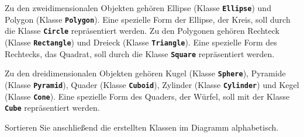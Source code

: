 Zu den zweidimensionalen Objekten gehören Ellipse (Klasse \texttt{\textbf{Ellipse}}) und Polygon (Klasse \texttt{\textbf{Polygon}}). Eine spezielle Form der Ellipse, der Kreis, soll durch die Klasse \texttt{\textbf{Circle}} repräsentiert werden. Zu den Polygonen gehören Rechteck (Klasse \texttt{\textbf{Rectangle}}) und Dreieck (Klasse \texttt{\textbf{Triangle}}). Eine spezielle Form des Rechtecks, das Quadrat, soll durch die Klasse \texttt{\textbf{Square}} repräsentiert werden.

Zu den dreidimensionalen Objekten gehören Kugel (Klasse \texttt{\textbf{Sphere}}), Pyramide (Klasse \texttt{\textbf{Pyramid}}), Quader (Klasse \texttt{\textbf{Cuboid}}), Zylinder (Klasse \texttt{\textbf{Cylinder}}) und Kegel (Klasse \texttt{\textbf{Cone}}). Eine spezielle Form des Quaders, der Würfel, soll mit der Klasse \texttt{\textbf{Cube}} repräsentiert werden.

Sortieren Sie anschließend die erstellten Klassen im Diagramm alphabetisch.
